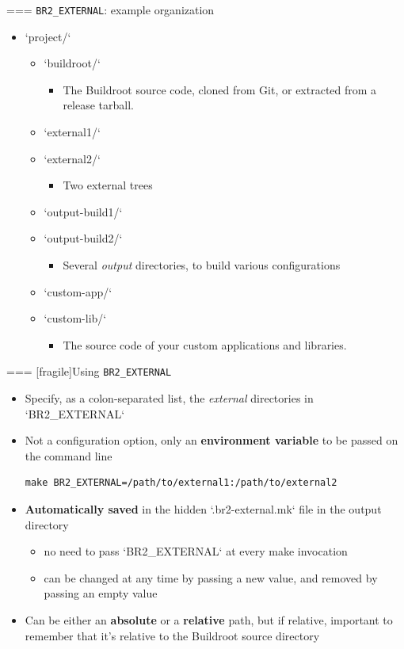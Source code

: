 === {{\tt BR2\_EXTERNAL}: example organization}

  \begin{itemize}
  \item `project/`
    \begin{itemize}
    \item `buildroot/`
      \begin{itemize}
      \item The Buildroot source code, cloned from Git, or extracted
        from a release tarball.
      \end{itemize}
    \item `external1/`
    \item `external2/`
      \begin{itemize}
      \item Two external trees
      \end{itemize}
    \item `output-build1/`
    \item `output-build2/`
      \begin{itemize}
      \item Several {\em output} directories, to build various configurations
      \end{itemize}
    \item `custom-app/`
    \item `custom-lib/`
      \begin{itemize}
      \item The source code of your custom applications and libraries.
      \end{itemize}
    \end{itemize}
  \end{itemize}


=== [fragile]{Using {\tt BR2\_EXTERNAL}}
  \begin{itemize}
  \item Specify, as a colon-separated list, the {\em external}
    directories in `BR2_EXTERNAL`
  \item Not a configuration option, only an {\bf environment variable}
    to be passed on the command line
    \begin{block}{}
\begin{verbatim}
make BR2_EXTERNAL=/path/to/external1:/path/to/external2
\end{verbatim}
    \end{block}
  \item {\bf Automatically saved} in the hidden `.br2-external.mk`
    file in the output directory
    \begin{itemize}
    \item no need to pass `BR2_EXTERNAL` at every make invocation
    \item can be changed at any time by passing a new value, and
      removed by passing an empty value
    \end{itemize}
  \item Can be either an {\bf absolute} or a {\bf relative} path, but
    if relative, important to remember that it's relative to the
    Buildroot source directory
  \end{itemize}


